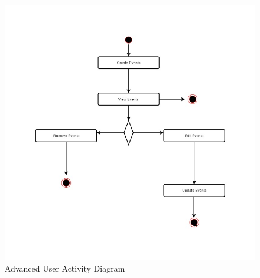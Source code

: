 \documentclass{article}
\begin{document}
    
    \mbox{}\\
    \bigskip
    
    \begin{figure}[h!]
        \includegraphics[width=\textwidth]{Events/Images/ActivityDiagramAdmin.jpg} \caption{Advanced User Activity Diagram}
    \end{figure}
    
    
    \mbox{}\\
    \bigskip
   
\end{document}
